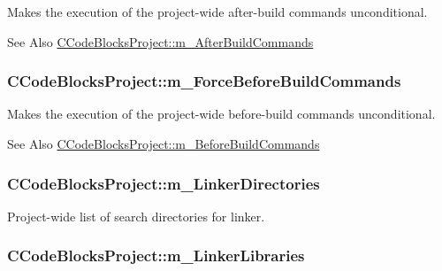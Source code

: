 Makes the execution of the project-\/wide after-\/build commands unconditional. 

\begin{DoxySeeAlso}{See Also}
\hyperlink{classCCodeBlocksProject_a8ab245f49e6a9c903873054f36fc3131}{C\-Code\-Blocks\-Project\-::m\-\_\-\-After\-Build\-Commands} 
\end{DoxySeeAlso}
\hypertarget{classCCodeBlocksProject_a42c6e9a55bf442874867b2ae3b6bdbbd}{
\subsubsection[{m\-\_\-\-Force\-Before\-Build\-Commands}]{\setlength{\rightskip}{0pt plus 5cm}C\-Code\-Blocks\-Project\-::m\-\_\-\-Force\-Before\-Build\-Commands\hspace{0.3cm}{\ttfamily [private]}}}\label{classCCodeBlocksProject_a42c6e9a55bf442874867b2ae3b6bdbbd}


Makes the execution of the project-\/wide before-\/build commands unconditional. 

\begin{DoxySeeAlso}{See Also}
\hyperlink{classCCodeBlocksProject_aefda434d2b3f3b58ae91041e5832f9d0}{C\-Code\-Blocks\-Project\-::m\-\_\-\-Before\-Build\-Commands} 
\end{DoxySeeAlso}
\hypertarget{classCCodeBlocksProject_a16cac351f48df53ca7c1e5c072983e3a}{
\subsubsection[{m\-\_\-\-Linker\-Directories}]{\setlength{\rightskip}{0pt plus 5cm}C\-Code\-Blocks\-Project\-::m\-\_\-\-Linker\-Directories\hspace{0.3cm}{\ttfamily [private]}}}\label{classCCodeBlocksProject_a16cac351f48df53ca7c1e5c072983e3a}


Project-\/wide list of search directories for linker. 

\hypertarget{classCCodeBlocksProject_af731d75a45cfe7adf484cd1033c5940d}{
\subsubsection[{m\-\_\-\-Linker\-Libraries}]{\setlength{\rightskip}{0pt plus 5cm}C\-Code\-Blocks\-Project\-::m\-\_\-\-Linker\-Libraries\hspace{0.3cm}{\ttfamily [private]}}}\label{classCCodeBlocksProject_af731d75a45cfe7adf484cd1033c5940d}


